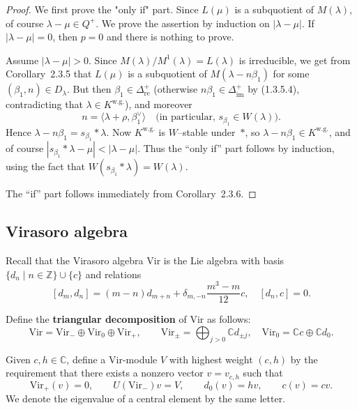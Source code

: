 \documentclass[12pt]{article}
\begin{document}
\begin{proof}
We first prove the "only if" part.  
Since $L(\mu)$ is a subquotient of $M(\lambda)$, of course
$\lambda-\mu\in Q^+$. We prove the assertion by induction on
$|\lambda-\mu|$. If $|\lambda-\mu|=0$, then $p=0$ and there is nothing to prove.

Assume $|\lambda-\mu|>0$. Since $M(\lambda)/M^1(\lambda)=L(\lambda)$ is irreducible,
we get from Corollary~2.3.5 that $L(\mu)$ is a subquotient of $M(\lambda-n\beta_1)$
for some $(\beta_1,n)\in D_\lambda$.  
But then $\beta_1\in\Delta^+_{\mathrm{re}}$
(otherwise $n\beta_1\in\Delta^+_{\mathrm{im}}$ by (1.3.5.4),
contradicting that $\lambda\in K^{\mathrm{w.g.}}$), and moreover
\[
n=\langle\lambda+\rho,\beta_1^\vee\rangle
\quad\text{(in particular, } s_{\beta_1}\in W(\lambda)\text{)}.
\]
Hence $\lambda-n\beta_1 = s_{\beta_1}*\lambda$.
Now $K^{\mathrm{w.g.}}$ is $W$–stable under~$*$, so
$\lambda-n\beta_1\in K^{\mathrm{w.g.}}$, and of course
$|s_{\beta_1}*\lambda-\mu|<|\lambda-\mu|$.
Thus the ``only if'' part follows by induction,
using the fact that $W(s_{\beta_1}*\lambda)=W(\lambda)$.

The ``if'' part follows immediately from Corollary~2.3.6.
\end{proof}

\subsection{Virasoro algebra}
Recall that the Virasoro algebra $\mathrm{Vir}$ is the Lie algebra with basis
$\{d_n \mid n \in \mathbb{Z}\} \cup \{c\}$ and relations
\[[d_m, d_n] = (m-n)d_{m+n} + \delta_{m,-n} \frac{m^3 - m}{12} c, \quad [d_n, c] = 0.\]

Define the \textbf{triangular decomposition} of $\mathrm{Vir}$ as follows:
\[
    \mathrm{Vir} = \mathrm{Vir}_- \oplus \mathrm{Vir}_0 \oplus \mathrm{Vir}_+,
    \qquad
    \mathrm{Vir}_\pm = \bigoplus_{j>0} \mathbb{C} d_{\pm j}, \quad
    \mathrm{Vir}_0 = \mathbb{C} c \oplus \mathbb{C} d_0.
\]

Given $c,h \in \mathbb{C}$, define a $\mathrm{Vir}$-module $V$ with highest
weight $(c,h)$ by the requirement that there exists a nonzero vector
$v = v_{c,h}$ such that
\[
    \mathrm{Vir}_+(v) = 0, \qquad U(\mathrm{Vir}_-)v = V, \qquad
    d_0(v) = h v, \qquad c(v) = c v.
\]
We denote the eigenvalue of a central element by the same letter.
\end{document}
